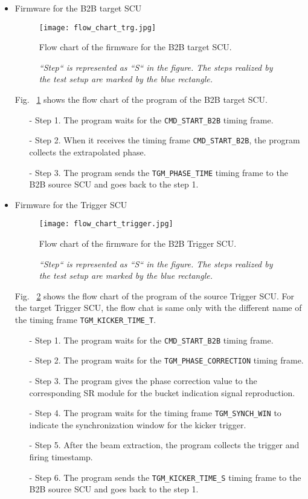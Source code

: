 \begin{itemize}
\begin{itemize}
	\end{itemize}
\item Firmware for the B2B target SCU
\begin{figure}[H]
   \centering   
   \texttt{[image: flow\_chart\_trg.jpg]}
   \caption{Flow chart of the firmware for the B2B target SCU.}
	\caption*{\textsl{\small{``Step`` is represented as ``S`` in the figure. The steps realized by the test setup are marked by the blue rectangle.}}}
   \label{flow_chart_trg}
\end{figure}
Fig. ~\ref{flow_chart_trg} shows the flow chart of the program of the B2B target SCU.
 	\begin{itemize}
		\item[-]Step 1. The program waits for the \verb|CMD_START_B2B| timing frame.
 		\item[-]Step 2. When it receives the timing frame \verb|CMD_START_B2B|, the program collects the extrapolated phase.
		\item[-]Step 3. The program sends the \verb|TGM_PHASE_TIME| timing frame to the B2B source SCU and goes back to the step 1.
	\end{itemize}
\item Firmware for the Trigger SCU
\begin{figure}[H]
   \centering   
   \texttt{[image: flow\_chart\_trigger.jpg]}
   \caption{Flow chart of the firmware for the B2B Trigger SCU.}
	\caption*{\textsl{\small{``Step`` is represented as ``S`` in the figure. The steps realized by the test setup are marked by the blue rectangle.}}}
   \label{flow_chart_trigger}
\end{figure}
Fig. ~\ref{flow_chart_trigger} shows the flow chart of the program of the source Trigger SCU. For the target Trigger SCU, the flow chat is same only with the different name of the timing frame \verb|TGM_KICKER_TIME_T|.
 	\begin{itemize}
		\item[-]Step 1. The program waits for the \verb|CMD_START_B2B| timing frame.
		\item[-]Step 2. The program waits for the \verb|TGM_PHASE_CORRECTION| timing frame.
		\item[-]Step 3. The program gives the phase correction value to the corresponding SR module for the bucket indication signal reproduction.
 		\item[-]Step 4. The program waits for the timing frame \verb|TGM_SYNCH_WIN| to indicate the synchronization window for the kicker trigger.
		\item[-]Step 5. After the beam extraction, the program collects the trigger and firing timestamp. 
		\item[-]Step 6. The program sends the \verb|TGM_KICKER_TIME_S| timing frame to the B2B source SCU and goes back to the step 1.
	\end{itemize}

\end{itemize}
